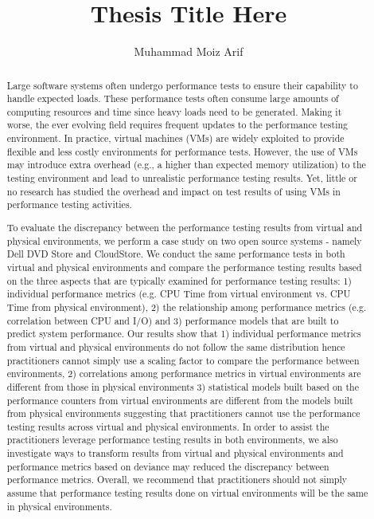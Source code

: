 \documentclass[12pt]{report}
\author{Muhammad Moiz Arif}
\title {Thesis Title Here}
\begin{document}
\begin{abstract}

Large software systems often undergo performance tests to ensure their capability to handle expected loads. These performance tests often consume large amounts of computing resources and time since heavy loads need to be generated. Making it worse, the ever evolving field requires frequent updates to the performance testing environment. In practice, virtual machines (VMs) are widely exploited to provide flexible and less costly environments for performance tests. However, the use of VMs may introduce extra overhead (e.g., a higher than expected memory utilization) to the testing environment and lead to unrealistic performance testing results. Yet, little or no research has studied the overhead and impact on test results of using VMs in performance testing activities. 

To evaluate the discrepancy between the performance testing results from virtual and physical environments, we perform a case study on two open source systems - namely Dell DVD Store and CloudStore. We conduct the same performance tests in both virtual and physical environments and compare the performance testing results based on the three aspects that are typically examined for performance testing results: 1) individual performance metrics (e.g. CPU Time from virtual environment vs. CPU Time from physical environment), 2) the relationship among performance metrics (e.g. correlation between CPU and I/O) and 3) performance models that are built to predict system performance. Our results show that 1) individual performance metrics from virtual and physical environments do not follow the same distribution hence practitioners cannot simply use a scaling factor to compare the performance between environments,  2) correlations among performance metrics in virtual environments are different from those in physical environments 3) statistical models built based on the performance counters from virtual environments are different from the models built from physical environments suggesting that practitioners cannot use the performance testing results across virtual and physical environments. In order to assist the practitioners leverage performance testing results in both environments, we also investigate ways to transform results from virtual and physical environments and performance metrics based on deviance may reduced the discrepancy between performance metrics. Overall, we recommend that practitioners should not simply assume that performance testing results done on virtual environments will be the same in physical environments.

\end{abstract}
\end{document}
